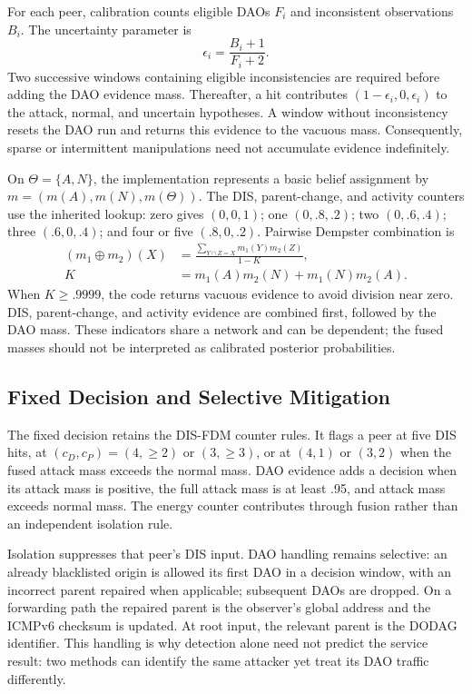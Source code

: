 For each peer, calibration counts eligible DAOs $F_i$ and inconsistent observations $B_i$. The uncertainty parameter is
\begin{equation}
 \epsilon_i=\frac{B_i+1}{F_i+2}.
\end{equation}
Two successive windows containing eligible inconsistencies are required before adding the DAO evidence mass. Thereafter, a hit contributes $(1-\epsilon_i,0,\epsilon_i)$ to the attack, normal, and uncertain hypotheses. A window without inconsistency resets the DAO run and returns this evidence to the vacuous mass. Consequently, sparse or intermittent manipulations need not accumulate evidence indefinitely.

On $\Theta=\{A,N\}$, the implementation represents a basic belief assignment by $m=(m(A),m(N),m(\Theta))$. The DIS, parent-change, and activity counters use the inherited lookup: zero gives $(0,0,1)$; one $(0,.8,.2)$; two $(0,.6,.4)$; three $(.6,0,.4)$; and four or five $(.8,0,.2)$. Pairwise Dempster combination is
\begin{equation}
 \begin{aligned}
 (m_1\oplus m_2)(X)&=\frac{\sum_{Y\cap Z=X}m_1(Y)m_2(Z)}{1-K},\\
 K&=m_1(A)m_2(N)+m_1(N)m_2(A).
 \end{aligned}
\end{equation}
When $K\ge .9999$, the code returns vacuous evidence to avoid division near zero. DIS, parent-change, and activity evidence are combined first, followed by the DAO mass. These indicators share a network and can be dependent; the fused masses should not be interpreted as calibrated posterior probabilities.

\subsection{Fixed Decision and Selective Mitigation}
The fixed decision retains the DIS-FDM counter rules. It flags a peer at five DIS hits, at $(c_D,c_P)=(4,\ge2)$ or $(3,\ge3)$, or at $(4,1)$ or $(3,2)$ when the fused attack mass exceeds the normal mass. DAO evidence adds a decision when its attack mass is positive, the full attack mass is at least .95, and attack mass exceeds normal mass. The energy counter contributes through fusion rather than an independent isolation rule.

Isolation suppresses that peer's DIS input. DAO handling remains selective: an already blacklisted origin is allowed its first DAO in a decision window, with an incorrect parent repaired when applicable; subsequent DAOs are dropped. On a forwarding path the repaired parent is the observer's global address and the ICMPv6 checksum is updated. At root input, the relevant parent is the DODAG identifier. This handling is why detection alone need not predict the service result: two methods can identify the same attacker yet treat its DAO traffic differently.

